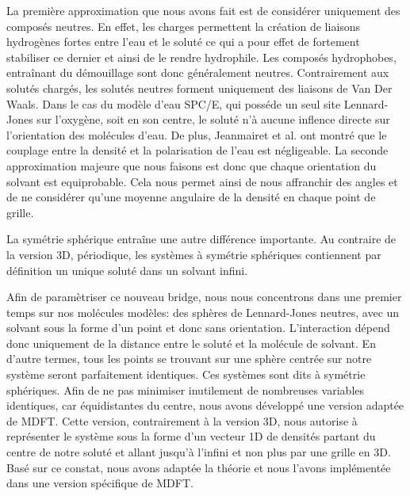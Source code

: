 La première approximation que nous avons fait est de considérer uniquement des composés neutres.
En effet, les charges permettent la création de liaisons hydrogènes fortes entre l'eau et le soluté ce qui a pour effet de fortement stabiliser ce dernier et ainsi de le rendre hydrophile.
Les composés hydrophobes, entraînant du démouillage sont donc généralement neutres.
Contrairement aux solutés chargés, les solutés neutres forment uniquement des liaisons de Van Der Waals.
Dans le cas du modèle d'eau SPC/E, qui posséde un seul site Lennard-Jones sur l'oxygène, soit en son centre, le soluté n'à aucune inflence directe sur l'orientation des molécules d'eau.
De plus, Jeanmairet et al.\cite{jeanmairet_molecular_2013, jeanmairet_molecular_2016} ont montré que le couplage entre la densité et la polarisation de l'eau est négligeable.
La seconde approximation majeure que nous faisons est donc que chaque orientation du solvant est equiprobable. Cela nous permet ainsi de nous affranchir des angles et de ne considérer qu'une moyenne angulaire de la densité en chaque point de grille.

La symétrie sphérique entraîne une autre différence importante. Au contraire de la version 3D, périodique, les systèmes à symétrie sphériques contiennent par définition un unique soluté dans un solvant infini.

Afin de paramètriser ce nouveau bridge, nous nous concentrons dans une premier temps sur nos molécules modèles: des sphères de Lennard-Jones neutres, avec un solvant sous la forme d'un point et donc sans orientation. L’interaction dépend donc uniquement de la distance entre le soluté et la molécule de solvant. En d'autre termes, tous les points se trouvant sur une sphère centrée sur notre système seront parfaitement identiques. Ces systèmes sont dits à symétrie sphériques. Afin de ne pas minimiser inutilement de nombreuses variables identiques, car équidistantes du centre, nous avons développé une version adaptée de MDFT. Cette version, contrairement à la version 3D, nous autorise à représenter le système sous la forme d'un vecteur 1D de densités partant du centre de notre soluté et allant jusqu'à l'infini et non plus par une grille en 3D. Basé sur ce constat, nous avons adaptée la théorie et nous l'avons implémentée dans une version spécifique de MDFT.



